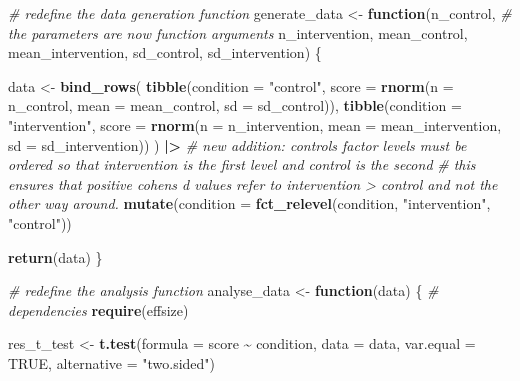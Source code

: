 \documentclass[
]{article}
\newenvironment{Shaded}{\begin{snugshade}}{\end{snugshade}}
\newcommand{\AttributeTok}[1]{\textcolor[rgb]{0.13,0.29,0.53}{#1}}
\newcommand{\CommentTok}[1]{\textcolor[rgb]{0.56,0.35,0.01}{\textit{#1}}}
\newcommand{\ConstantTok}[1]{\textcolor[rgb]{0.56,0.35,0.01}{#1}}
\newcommand{\ControlFlowTok}[1]{\textcolor[rgb]{0.13,0.29,0.53}{\textbf{#1}}}
\newcommand{\FunctionTok}[1]{\textcolor[rgb]{0.13,0.29,0.53}{\textbf{#1}}}
\newcommand{\NormalTok}[1]{#1}
\newcommand{\OtherTok}[1]{\textcolor[rgb]{0.56,0.35,0.01}{#1}}
\newcommand{\SpecialCharTok}[1]{\textcolor[rgb]{0.81,0.36,0.00}{\textbf{#1}}}
\newcommand{\StringTok}[1]{\textcolor[rgb]{0.31,0.60,0.02}{#1}}
\begin{document}
\begin{Shaded}
\begin{Highlighting}[]
\CommentTok{\# redefine the data generation function}
\NormalTok{generate\_data }\OtherTok{\textless{}{-}} \ControlFlowTok{function}\NormalTok{(n\_control, }\CommentTok{\# the parameters are now function arguments}
\NormalTok{                          n\_intervention,}
\NormalTok{                          mean\_control,}
\NormalTok{                          mean\_intervention,}
\NormalTok{                          sd\_control,}
\NormalTok{                          sd\_intervention) \{}
  
\NormalTok{  data }\OtherTok{\textless{}{-}} 
    \FunctionTok{bind\_rows}\NormalTok{(}
      \FunctionTok{tibble}\NormalTok{(}\AttributeTok{condition =} \StringTok{"control"}\NormalTok{,}
             \AttributeTok{score =} \FunctionTok{rnorm}\NormalTok{(}\AttributeTok{n =}\NormalTok{ n\_control, }\AttributeTok{mean =}\NormalTok{ mean\_control, }\AttributeTok{sd =}\NormalTok{ sd\_control)),}
      \FunctionTok{tibble}\NormalTok{(}\AttributeTok{condition =} \StringTok{"intervention"}\NormalTok{,}
             \AttributeTok{score =} \FunctionTok{rnorm}\NormalTok{(}\AttributeTok{n =}\NormalTok{ n\_intervention, }\AttributeTok{mean =}\NormalTok{ mean\_intervention, }\AttributeTok{sd =}\NormalTok{ sd\_intervention))}
\NormalTok{    ) }\SpecialCharTok{|\textgreater{}}
  \CommentTok{\# new addition: control\textquotesingle{}s factor levels must be ordered so that intervention is the first level and control is the second}
  \CommentTok{\# this ensures that positive cohen\textquotesingle{}s d values refer to intervention \textgreater{} control and not the other way around.}
  \FunctionTok{mutate}\NormalTok{(}\AttributeTok{condition =} \FunctionTok{fct\_relevel}\NormalTok{(condition, }\StringTok{"intervention"}\NormalTok{, }\StringTok{"control"}\NormalTok{))}
  
  \FunctionTok{return}\NormalTok{(data)}
\NormalTok{\}}

\CommentTok{\# redefine the analysis function}
\NormalTok{analyse\_data }\OtherTok{\textless{}{-}} \ControlFlowTok{function}\NormalTok{(data) \{}
  \CommentTok{\# dependencies}
  \FunctionTok{require}\NormalTok{(effsize)}
  
\NormalTok{  res\_t\_test }\OtherTok{\textless{}{-}} \FunctionTok{t.test}\NormalTok{(}\AttributeTok{formula =}\NormalTok{ score }\SpecialCharTok{\textasciitilde{}}\NormalTok{ condition, }
                       \AttributeTok{data =}\NormalTok{ data,}
                       \AttributeTok{var.equal =} \ConstantTok{TRUE}\NormalTok{,}
                       \AttributeTok{alternative =} \StringTok{"two.sided"}\NormalTok{)}
  

\end{Highlighting}
\end{Shaded}
\end{document}
